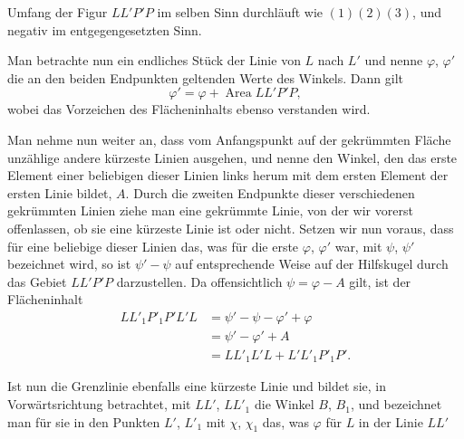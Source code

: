 %
Umfang der Figur $LL'P'P$ im selben Sinn durchläuft wie $(1)(2)(3)$, und negativ im entgegengesetzten Sinn.
\begin{center}
\hfill\hfill
\end{center}
\noindent\hspace*{1.2em}Man betrachte nun ein endliches Stück der Linie von $L$ nach $L'$ und nenne $\varphi$, $\varphi'$ die an den beiden Endpunkten geltenden Werte des Winkels. Dann gilt
\[
\varphi'=\varphi+\operatorname{Area}LL'P'P,
\]
wobei das Vorzeichen des Flächeninhalts ebenso verstanden wird.

Man nehme nun weiter an, dass vom Anfangspunkt auf der gekrümmten Fläche unzählige andere kürzeste Linien ausgehen, und nenne den Winkel, den das erste Element einer beliebigen dieser Linien links herum mit dem ersten Element der ersten Linie bildet, $A$. Durch die zweiten Endpunkte dieser verschiedenen gekrümmten Linien ziehe man eine gekrümmte Linie, von der wir vorerst offenlassen, ob sie eine kürzeste Linie ist oder nicht. Setzen wir nun voraus, dass für eine beliebige dieser Linien das, was für die erste $\varphi$, $\varphi'$ war, mit $\psi$, $\psi'$ bezeichnet wird, so ist $\psi'-\psi$ auf entsprechende Weise auf der Hilfskugel durch das Gebiet $LL'P'P$ darzustellen. Da offensichtlich $\psi=\varphi-A$ gilt, ist der Flächeninhalt
\[
\begin{aligned}
LL'_1P'_1P'L'L&=\psi'-\psi-\varphi'+\varphi\\
&=\psi'-\varphi'+A\\
&=LL'_1L'L+L'L'_1P'_1P'.
\end{aligned}
\]
\begin{center}\end{center}
\noindent\hspace*{1.2em}Ist nun die Grenzlinie ebenfalls eine kürzeste Linie und bildet sie, in Vorwärtsrichtung betrachtet, mit $LL'$, $LL'_1$ die Winkel $B$, $B_1$, und bezeichnet man für sie in den Punkten $L'$, $L'_1$ mit $\chi$, $\chi_1$ das, was $\varphi$ für $L$ in der Linie $LL'$
